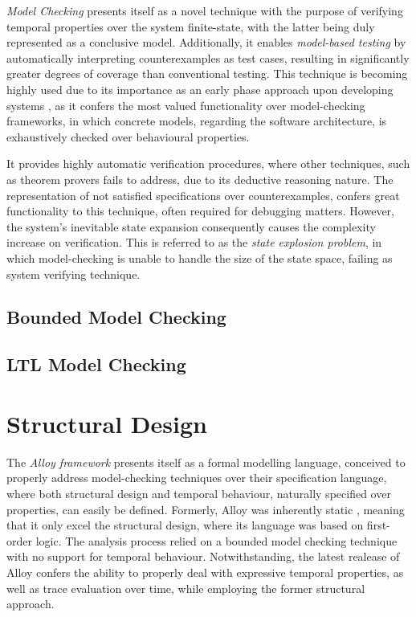 \textit{Model Checking} presents itself as a novel technique with the purpose of verifying temporal properties over the system finite-state, with the latter being duly represented as a conclusive model. Additionally, it enables \textit{model-based testing} by automatically interpreting counterexamples as test cases, resulting in significantly greater degrees of coverage than conventional testing. \cite{fraser2009testing, beyer2017software} This technique is becoming highly used due to its importance as an early phase approach upon developing systems \cite{lwspecification}, as it confers the most valued functionality over model-checking frameworks, in which concrete models, regarding the software architecture, is exhaustively checked over behavioural properties. 

It provides highly automatic verification procedures, where other techniques, such as theorem provers fails to address, due to its deductive reasoning nature. The representation of not satisfied specifications over counterexamples, confers great functionality to this technique, often required for debugging matters.
However, the system's inevitable state expansion consequently causes the complexity increase on verification. This is referred to as the \textit{state explosion problem}, in which model-checking is unable to handle the size of the state space, failing as system verifying technique. \cite{clarke2011model, clarke1997model} 


\subsection{Bounded Model Checking}

\subsection{LTL Model Checking}

\section{Structural Design}

The \textit{Alloy framework} presents itself as a formal modelling language, conceived to properly address model-checking techniques over their specification language, where both structural design and temporal behaviour, naturally specified over properties, can easily be defined. Formerly, Alloy was inherently static \cite{lwspecification}, meaning that it only excel the structural design, where its language was based on first-order logic. The analysis process relied on a bounded model checking technique with no support for temporal behaviour. Notwithstanding, the latest realease of Alloy confers the ability to properly deal with expressive temporal properties, as well as trace evaluation over time, while employing the former structural approach. 

